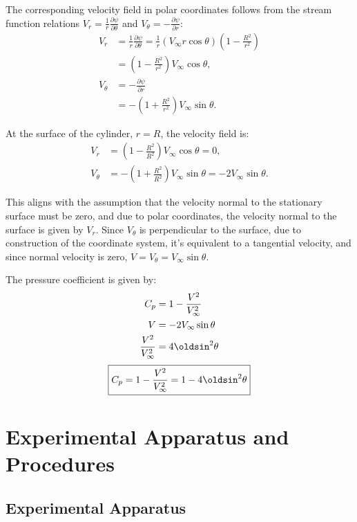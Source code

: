 The corresponding velocity field in polar coordinates follows from the stream function relations
\(V_r=\frac{1}{r}\frac{\partial \psi}{\partial \theta}\) and \(V_{\theta}=-\frac{\partial \psi}{\partial r}\):
\begin{align}
    V_r &= \frac{1}{r}\frac{\partial \psi}{\partial \theta} = \frac{1}{r}\left(V_{\infty} r \cos\theta\right)\left(1-\frac{R^2}{r^2}\right) \\
        &= \left(1-\frac{R^2}{r^2}\right)V_{\infty}\cos\theta, \\
    V_{\theta} &= -\frac{\partial \psi}{\partial r} \\
               &= -\left(1+\frac{R^2}{r^2}\right)V_{\infty}\sin\theta.
\end{align}

At the surface of the cylinder, \(r = R\), the velocity field is:
\begin{align}
    V_r &= \left(1-\frac{R^2}{R^2}\right)V_{\infty}\cos\theta = 0, \\
    V_{\theta} &= -\left(1+\frac{R^2}{R^2}\right)V_{\infty}\sin\theta = -2V_{\infty}\sin\theta.
\end{align}

This aligns with the assumption that the velocity normal to the stationary surface must be zero, and due to polar coordinates, the velocity normal to the surface is given by \(V_{r}\).
Since \(V_{\theta}\) is perpendicular to the surface, due to construction of the coordinate system, it's equivalent to a tangential velocity, and since normal velocity is zero, \(V = V_{\theta} = V_{\infty} \sin\theta\).

The pressure coefficient is given by:
\begin{align}
    C_p &= 1 - \frac{V^2}{V_{\infty}^2} \\
    V &= -2V_{\infty}\sin\theta \\
    \frac{V^2}{V_{\infty}^2} &= 4\oldsin^2\theta
\end{align}
\begin{equation}
    \boxed{C_p = 1 - \frac{V^2}{V_{\infty}^2} = 1 - 4\oldsin^2\theta} \label{eq:introduction/Cp}
\end{equation}

\section{Experimental Apparatus and Procedures} \label{sec:procedures}

\subsection{Experimental Apparatus} \label{sec:procedures/apparatus}

